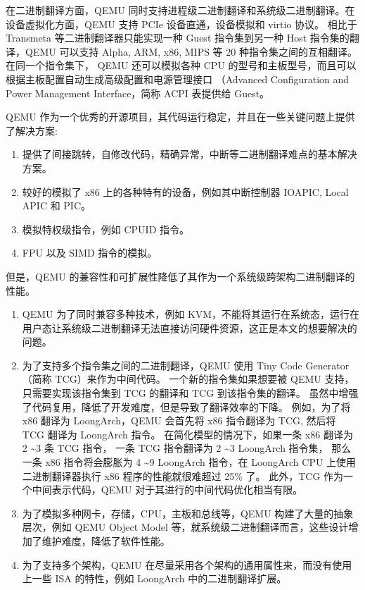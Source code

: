 在二进制翻译方面，QEMU 同时支持进程级二进制翻译和系统级二进制翻译。在设备虚拟化方面，QEMU 支持 PCIe 设备直通，设备模拟和 virtio 协议。
相比于 Transmeta 等二进制翻译器只能实现一种 Guest 指令集到另一种 Host 指令集的翻译，QEMU 可以支持 Alpha, ARM, x86, MIPS 等 20 种指令集之间的互相翻译。
在同一个指令集下， QEMU 还可以模拟各种 CPU 的型号和主板型号，而且可以根据主板配置自动生成高级配置和电源管理接口 （Advanced Configuration and Power Management Interface，简称 ACPI 表提供给 Guest。

QEMU 作为一个优秀的开源项目，其代码运行稳定，并且在一些关键问题上提供了解决方案:
\begin{enumerate}
	\item 提供了间接跳转，自修改代码，精确异常，中断等二进制翻译难点的基本解决方案。
	\item 较好的模拟了 x86 上的各种特有的设备，例如其中断控制器 IOAPIC, Local APIC 和 PIC。
	\item 模拟特权级指令，例如 CPUID 指令。
	\item FPU 以及 SIMD 指令的模拟。
\end{enumerate}

但是，QEMU 的兼容性和可扩展性降低了其作为一个系统级跨架构二进制翻译的性能。
\begin{enumerate}
	\item QEMU 为了同时兼容多种技术，例如 KVM，不能将其运行在系统态，运行在用户态让系统级二进制翻译无法直接访问硬件资源，这正是本文的想要解决的问题。
	\item 为了支持多个指令集之间的二进制翻译，QEMU 使用 Tiny Code Generator（简称 TCG）来作为中间代码。
	      一个新的指令集如果想要被 QEMU 支持，只需要实现该指令集到 TCG 的翻译和 TCG 到该指令集的翻译。
	      虽然中增强了代码复用，降低了开发难度，但是导致了翻译效率的下降。
	      例如，为了将 x86 翻译为 LoongArch，QEMU 会首先将 x86 指令翻译为 TCG, 然后将 TCG 翻译为 LoongArch 指令。
	      在简化模型的情况下，如果一条 x86 翻译为 2 \textasciitilde 3 条 TCG 指令，
	      一条 TCG 指令翻译为 2 \textasciitilde 3 LoongArch 指令集，
	      那么一条 x86 指令将会膨胀为 4 \textasciitilde 9 LoongArch 指令，在 LoongArch CPU 上使用二进制翻译器执行 x86 程序的性能就很难超过 25\% 了。
	      此外，TCG 作为一个中间表示代码，QEMU 对于其进行的中间代码优化相当有限。
	\item 为了模拟多种网卡，存储，CPU，主板和总线等，QEMU 构建了大量的抽象层次，例如 QEMU Object Model 等，就系统级二进制翻译而言，这些设计增加了维护难度，降低了软件性能。
	\item 为了支持多个架构，QEMU 在尽量采用各个架构的通用属性来，而没有使用上一些 ISA 的特性，例如 LoongArch 中的二进制翻译扩展。
\end{enumerate}

